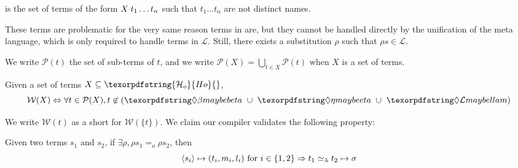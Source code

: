 \documentclass[sigconf,natbib=false,review]{acmart}
\newcommand{\appsep}{\ensuremath{\textcolor{lightgray}{\cdot}}}
\newcommand{\EqualRel}{\ensuremath{=}}
\newcommand{\UnifRel}{\ensuremath{\simeq}}
\newcommand{\Eo}{\ensuremath{\EqualRel_o}\xspace}
\newcommand{\Ue}{\ensuremath{\UnifRel_\lambda}\xspace}
\newcommand{\llambda}{\ensuremath{\mathcal{L}}\xspace}
\newcommand{\Ho}{\texorpdfstring{\ensuremath{\mathcal{H}_o}\xspace}{Ho}}
\begin{document}
\begin{definition}[\notllambda]\label{def:notllambda}
  \notllambda is the set of terms of the form $X \appsep t_1 \ldots t_n$
  such that $t_1 \ldots t_n$ are not distinct names.
\end{definition}

\noindent
These terms are problematic for the very same reason terms in \maybebeta are,
but they cannot be handled directly by the unification of the meta language, which
is only required to handle terms in \llambda. Still, there exists a
substitution $\rho$ such that $\rho s \in \llambda$.


\newcommand{\subterm}[1]{\ensuremath{\mathcal{P}(#1)}}
We write $\subterm{t}$ the set of sub-terms of $t$, and
we write $\subterm{X} = \bigcup_{t\in X} \subterm{t}$ when $X$ is a set of terms.

\newcommand{\wellb}{\ensuremath{\mathcal{W}}\xspace}
\begin{definition}
Given a set of terms $X \subseteq \Ho{}$,
$$
\wellb(X) \Leftrightarrow \forall t \in \subterm{X},
t \not\in (\maybebeta{} ~\cup~ \maybeeta{} ~\cup~ \notllambda{})
$$
\end{definition}

\noindent
We write $\wellb(t)$ as a short for $\wellb(\{t\})$.
We claim our compiler validates the following property: 

\begin{proposition}[\wellb-enforcing]\label{prop:w-enforcing}
  Given two terms $s_1$ and $s_2$, if $\exists \rho, \rho s_1 \Eo \rho s_2$,
  then 
  $$
    \C{s_i}{t_i}{m_i}{l_i} ~\mathrm{for}~ i \in \{ 1,2 \} \Rightarrow
    t_1 \Ue t_2 \mapsto \sigma \label{prop:compilation-w}
  $$
\end{proposition}
\end{document}
